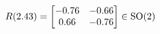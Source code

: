 \documentclass[preview]{standalone}
\begin{document}
\begin{align*}
\special{dvisvgm:raw <g id='unique000'>}R(2.43) = \begin{bmatrix} -0.76 & -0.66 \\ 0.66 & -0.76 \end{bmatrix} \in \text{SO}(2)\special{dvisvgm:raw </g>}
\end{align*}
\end{document}
